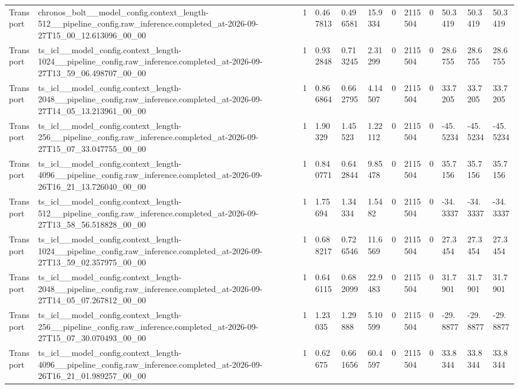 \begin{tabular}{llllllllllll}
Transport & chronos\_bolt\_\_model\_config.context\_length-512\_\_pipeline\_config.raw\_inference.completed\_at-2026-09-27T15\_00\_12.613096\_00\_00 & 1 & 0.467813 & 0.496581 & 15.9334 & 0 & 2115504 & 0 & 50.3419 & 50.3419 & 50.3419 \\
Transport & ts\_icl\_\_model\_config.context\_length-1024\_\_pipeline\_config.raw\_inference.completed\_at-2026-09-27T13\_59\_06.498707\_00\_00 & 1 & 0.932848 & 0.713245 & 2.31299 & 0 & 2115504 & 0 & 28.6755 & 28.6755 & 28.6755 \\
Transport & ts\_icl\_\_model\_config.context\_length-2048\_\_pipeline\_config.raw\_inference.completed\_at-2026-09-27T14\_05\_13.213961\_00\_00 & 1 & 0.866864 & 0.662795 & 4.14507 & 0 & 2115504 & 0 & 33.7205 & 33.7205 & 33.7205 \\
Transport & ts\_icl\_\_model\_config.context\_length-256\_\_pipeline\_config.raw\_inference.completed\_at-2026-09-27T15\_07\_33.047755\_00\_00 & 1 & 1.90329 & 1.45523 & 1.22112 & 0 & 2115504 & 0 & -45.5234 & -45.5234 & -45.5234 \\
Transport & ts\_icl\_\_model\_config.context\_length-4096\_\_pipeline\_config.raw\_inference.completed\_at-2026-09-26T16\_21\_13.726040\_00\_00 & 1 & 0.840771 & 0.642844 & 9.85478 & 0 & 2115504 & 0 & 35.7156 & 35.7156 & 35.7156 \\
Transport & ts\_icl\_\_model\_config.context\_length-512\_\_pipeline\_config.raw\_inference.completed\_at-2026-09-27T13\_58\_56.518828\_00\_00 & 1 & 1.75694 & 1.34334 & 1.5482 & 0 & 2115504 & 0 & -34.3337 & -34.3337 & -34.3337 \\
Transport & ts\_icl\_\_model\_config.context\_length-1024\_\_pipeline\_config.raw\_inference.completed\_at-2026-09-27T13\_59\_02.357975\_00\_00 & 1 & 0.688217 & 0.726546 & 11.6569 & 0 & 2115504 & 0 & 27.3454 & 27.3454 & 27.3454 \\
Transport & ts\_icl\_\_model\_config.context\_length-2048\_\_pipeline\_config.raw\_inference.completed\_at-2026-09-27T14\_05\_07.267812\_00\_00 & 1 & 0.646115 & 0.682099 & 22.9483 & 0 & 2115504 & 0 & 31.7901 & 31.7901 & 31.7901 \\
Transport & ts\_icl\_\_model\_config.context\_length-256\_\_pipeline\_config.raw\_inference.completed\_at-2026-09-27T15\_07\_30.070493\_00\_00 & 1 & 1.23035 & 1.29888 & 5.10599 & 0 & 2115504 & 0 & -29.8877 & -29.8877 & -29.8877 \\
Transport & ts\_icl\_\_model\_config.context\_length-4096\_\_pipeline\_config.raw\_inference.completed\_at-2026-09-26T16\_21\_01.989257\_00\_00 & 1 & 0.62675 & 0.661656 & 60.4597 & 0 & 2115504 & 0 & 33.8344 & 33.8344 & 33.8344 \\

\end{tabular}
